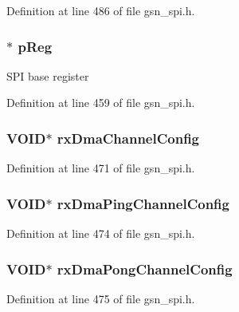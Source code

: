 Definition at line 486 of file gsn\_\-spi.h.

\hypertarget{a00230_a8843236297383a79c5da2bbddfcee223}{
\subsubsection[{pReg}]{$\ast$ {\bf pReg}}}
\label{a00230_a8843236297383a79c5da2bbddfcee223}
SPI base register 

Definition at line 459 of file gsn\_\-spi.h.

\hypertarget{a00230_a8c322936bd6cb1f93600dc207bb8fd0a}{
\subsubsection[{rxDmaChannelConfig}]{\setlength{\rightskip}{0pt plus 5cm}VOID$\ast$ {\bf rxDmaChannelConfig}}}
\label{a00230_a8c322936bd6cb1f93600dc207bb8fd0a}


Definition at line 471 of file gsn\_\-spi.h.

\hypertarget{a00230_ab10b1874804481103b375718a1788144}{
\subsubsection[{rxDmaPingChannelConfig}]{\setlength{\rightskip}{0pt plus 5cm}VOID$\ast$ {\bf rxDmaPingChannelConfig}}}
\label{a00230_ab10b1874804481103b375718a1788144}


Definition at line 474 of file gsn\_\-spi.h.

\hypertarget{a00230_aa2733539030c490c8bc19d5ea2185f4a}{
\subsubsection[{rxDmaPongChannelConfig}]{\setlength{\rightskip}{0pt plus 5cm}VOID$\ast$ {\bf rxDmaPongChannelConfig}}}
\label{a00230_aa2733539030c490c8bc19d5ea2185f4a}


Definition at line 475 of file gsn\_\-spi.h.

